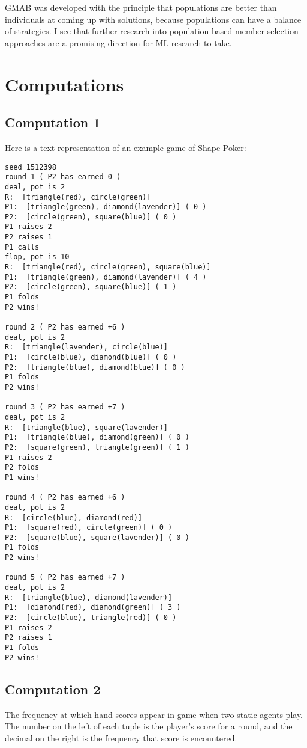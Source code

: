 \documentclass[11pt]{article}
\begin{document}
GMAB was developed with the principle that populations are better than individuals at coming up with solutions, because populations can have a balance of strategies. I see that further research into population-based member-selection approaches are a promising direction for ML research to take.

\newpage
\section{Computations}
\subsection{Computation 1}
Here is a text representation of an example game of Shape Poker:

\begin{verbatim}
seed 1512398
round 1 ( P2 has earned 0 )
deal, pot is 2
R:  [triangle(red), circle(green)]
P1:  [triangle(green), diamond(lavender)] ( 0 )
P2:  [circle(green), square(blue)] ( 0 )
P1 raises 2
P2 raises 1
P1 calls
flop, pot is 10
R:  [triangle(red), circle(green), square(blue)]
P1:  [triangle(green), diamond(lavender)] ( 4 )
P2:  [circle(green), square(blue)] ( 1 )
P1 folds
P2 wins!

round 2 ( P2 has earned +6 )
deal, pot is 2
R:  [triangle(lavender), circle(blue)]
P1:  [circle(blue), diamond(blue)] ( 0 )
P2:  [triangle(blue), diamond(blue)] ( 0 )
P1 folds
P2 wins!

round 3 ( P2 has earned +7 )
deal, pot is 2
R:  [triangle(blue), square(lavender)]
P1:  [triangle(blue), diamond(green)] ( 0 )
P2:  [square(green), triangle(green)] ( 1 )
P1 raises 2
P2 folds
P1 wins!

round 4 ( P2 has earned +6 )
deal, pot is 2
R:  [circle(blue), diamond(red)]
P1:  [square(red), circle(green)] ( 0 )
P2:  [square(blue), square(lavender)] ( 0 )
P1 folds
P2 wins!

round 5 ( P2 has earned +7 )
deal, pot is 2
R:  [triangle(blue), diamond(lavender)]
P1:  [diamond(red), diamond(green)] ( 3 )
P2:  [circle(blue), triangle(red)] ( 0 )
P1 raises 2
P2 raises 1
P1 folds
P2 wins!
\end{verbatim}


\subsection{Computation 2}
The frequency at which hand scores appear in game when two static agents play. The number on the left of each tuple is the player's score for a round, and the decimal on the right is the frequency that score is encountered.
\end{document}

